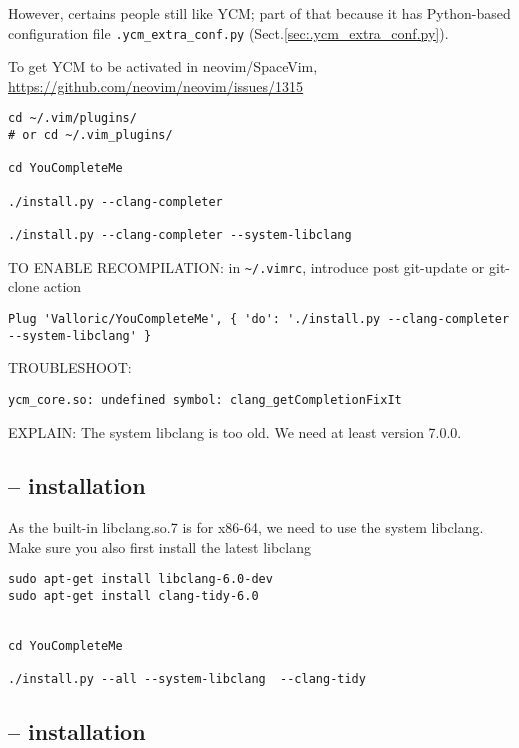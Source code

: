 However, certains people still like YCM; part of that because it has
Python-based configuration file \verb!.ycm_extra_conf.py!
(Sect.\ref{sec:.ycm_extra_conf.py}).

To get YCM to be activated in neovim/SpaceVim, 
\url{https://github.com/neovim/neovim/issues/1315}


\begin{verbatim}
cd ~/.vim/plugins/
# or cd ~/.vim_plugins/

cd YouCompleteMe

./install.py --clang-completer

./install.py --clang-completer --system-libclang
\end{verbatim}

TO ENABLE RECOMPILATION: in \verb!~/.vimrc!, 
introduce post git-update or git-clone action
\begin{verbatim}
Plug 'Valloric/YouCompleteMe', { 'do': './install.py --clang-completer --system-libclang' }
\end{verbatim}

TROUBLESHOOT:
\begin{verbatim}
ycm_core.so: undefined symbol: clang_getCompletionFixIt
\end{verbatim}
EXPLAIN: The system libclang is too old. We need at least version 7.0.0.


\subsection{-- installation}
\label{sec:YouCompleteMe-install-on-PowerPC-IBM}


As the built-in libclang.so.7 is for x86-64, we need to use the system libclang.
Make sure you also first install the latest libclang

\begin{verbatim}
sudo apt-get install libclang-6.0-dev
sudo apt-get install clang-tidy-6.0


cd YouCompleteMe

./install.py --all --system-libclang  --clang-tidy
\end{verbatim}

\subsection{-- installation}
\label{sec:YouCompleteMe-install}


